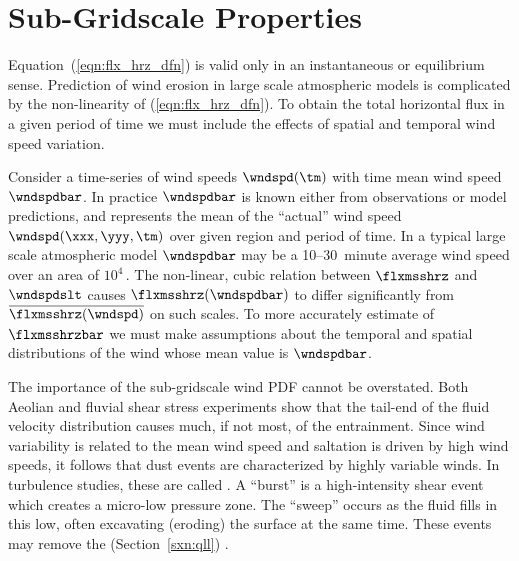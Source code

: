 \documentclass[12pt,twoside]{book}
\begin{document}
\section{Sub-Gridscale Properties}
Equation~(\ref{eqn:flx_hrz_dfn}) is valid only in an instantaneous or
equilibrium sense.
Prediction of wind erosion in large scale atmospheric models is
complicated by the non-linearity of (\ref{eqn:flx_hrz_dfn}).
To obtain the total horizontal flux in a given period of time we must
include the effects of spatial and temporal wind speed variation.

Consider a time-series of wind speeds $\wndspd(\tm)$ with
time mean wind speed $\wndspdbar$.
In practice $\wndspdbar$ is known either from observations or model
predictions, and represents the mean of the ``actual'' wind speed
$\wndspd(\xxx,\yyy,\tm)$ over given region and period of time.
In a typical large scale atmospheric model $\wndspdbar$ may be a
10--30~minute average wind speed over an area of $10^{4}$\,\kmS.
The non-linear, cubic relation between $\flxmsshrz$ and $\wndspdslt$
causes $\flxmsshrz(\wndspdbar)$ to differ significantly from
$\overline{\flxmsshrz(\wndspd)}$ on such scales. 
To more accurately estimate of $\flxmsshrzbar$ we must make
assumptions about the temporal and spatial distributions of the wind 
whose mean value is $\wndspdbar$.  

The importance of the sub-gridscale wind PDF cannot be overstated.
Both Aeolian and fluvial shear stress experiments show that the
tail-end of the fluid velocity distribution causes much, if not most, 
of the entrainment.
Since wind variability is related to the mean wind speed
\cite[]{JHM78} and saltation is driven by high wind speeds,
it follows that dust events are characterized by highly variable
winds. 
In turbulence studies, these are called .
A ``burst'' is a high-intensity shear event which creates a micro-low
pressure zone.
The ``sweep'' occurs as the fluid fills in this low, often excavating
(eroding) the surface at the same time.
These events may remove the 
(Section~\ref{sxn:qll}) \cite[]{SeH78}. 
\end{document}
